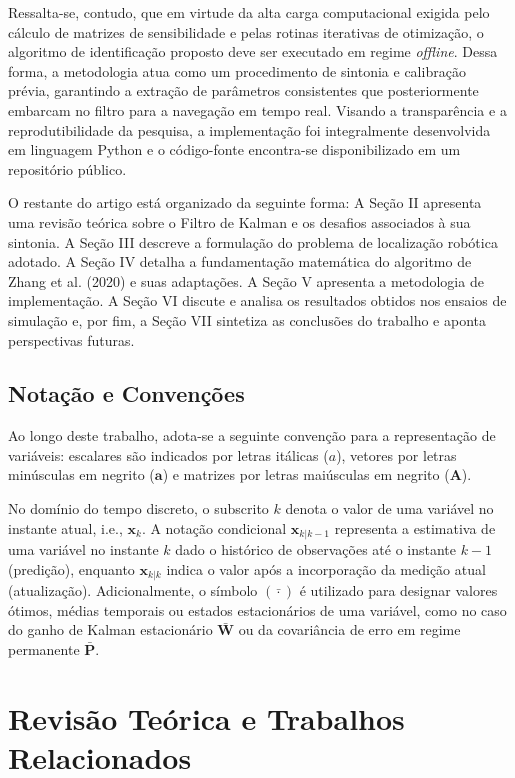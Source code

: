 \documentclass[journal]{IEEEtran}
\begin{document}
Ressalta-se, contudo, que em virtude da alta carga computacional exigida pelo cálculo de matrizes de sensibilidade e pelas rotinas iterativas de otimização, o algoritmo de identificação proposto deve ser executado em regime \textit{offline}. Dessa forma, a metodologia atua como um procedimento de sintonia e calibração prévia, garantindo a extração de parâmetros consistentes que posteriormente embarcam no filtro para a navegação em tempo real. Visando a transparência e a reprodutibilidade da pesquisa, a implementação foi integralmente desenvolvida em linguagem Python e o código-fonte encontra-se disponibilizado em um repositório público.

O restante do artigo está organizado da seguinte forma: A Seção II apresenta uma revisão teórica sobre o Filtro de Kalman e os desafios associados à sua sintonia. A Seção III descreve a formulação do problema de localização robótica adotado. A Seção IV detalha a fundamentação matemática do algoritmo de Zhang et al. (2020) e suas adaptações. A Seção V apresenta a metodologia de implementação. A Seção VI discute e analisa os resultados obtidos nos ensaios de simulação e, por fim, a Seção VII sintetiza as conclusões do trabalho e aponta perspectivas futuras.

\subsection{Notação e Convenções}

Ao longo deste trabalho, adota-se a seguinte convenção para a representação de variáveis: escalares são indicados por letras itálicas ($a$), vetores por letras minúsculas em negrito ($\mathbf{a}$) e matrizes por letras maiúsculas em negrito ($\mathbf{A}$). 

No domínio do tempo discreto, o subscrito $k$ denota o valor de uma variável no instante atual, i.e., $\mathbf{x}_k$. A notação condicional $\mathbf{x}_{k|k-1}$ representa a estimativa de uma variável no instante $k$ dado o histórico de observações até o instante $k-1$ (predição), enquanto $\mathbf{x}_{k|k}$ indica o valor após a incorporação da medição atual (atualização). Adicionalmente, o símbolo $(\bar{\cdot})$ é utilizado para designar valores ótimos, médias temporais ou estados estacionários de uma variável, como no caso do ganho de Kalman estacionário $\bar{\mathbf{W}}$ ou da covariância de erro em regime permanente $\bar{\mathbf{P}}$.

\section{Revisão Teórica e Trabalhos Relacionados}
\end{document}
